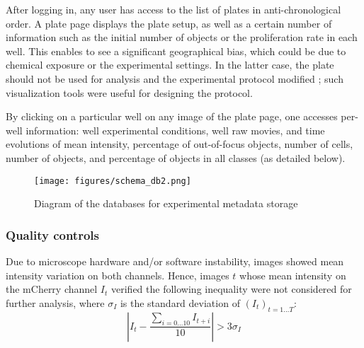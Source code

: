 After logging in, any user has access to the list of plates in anti-chronological order. A plate page displays the plate setup, as well as a certain number of information such as the initial number of objects or the proliferation rate in each well. This enables to see a significant geographical bias, which could be due to chemical exposure or the experimental settings. In the latter case, the plate should not be used for analysis and the experimental protocol modified ; such visualization tools were useful for designing the protocol. 

By clicking on a particular well on any image of the plate page, one accesses per-well information: well experimental conditions, well raw movies, and time evolutions of mean intensity, percentage of out-of-focus objects, number of cells, number of objects, and percentage of objects in all classes (as detailed below).

\begin{figure}
\centering
\texttt{[image: figures/schema\_db2.png]}
\caption{Diagram of the databases for experimental metadata storage}
\label{db}
\end{figure}


\subsubsection{Quality controls}
Due to microscope hardware and/or software instability, images showed mean intensity variation on both channels. Hence, images $t$ whose mean intensity on the mCherry channel $I_t$ verified the following inequality were not considered for further analysis, where $\sigma_I $ is the standard deviation of $(I_t)_{t=1\ldots T}$:
\[ |I_t- \dfrac{\sum_{i=0\ldots 10} I_{t+i} }{10}| > 3\sigma_I  \]

